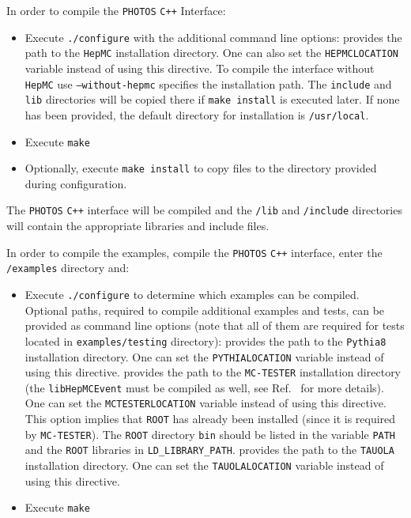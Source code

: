 \documentclass[]{Photos_interface_design}
\begin{document}
In order to compile the {\tt PHOTOS} {\tt C++} Interface:
\begin{itemize}
 \item Execute {\tt ./configure} with the additional command line options:
    provides the path to the {\tt HepMC} installation directory. One can also set the {\tt HEPMCLOCATION} variable instead of using this directive. To compile the interface without {\tt HepMC} use {\tt --without-hepmc}
    specifies the installation path. The {\tt include} and {\tt lib} directories will be copied there if {\tt make install} is executed later. If none has been provided, the default directory for installation is {\tt /usr/local}.
 \item Execute {\tt make}
 \item Optionally, execute {\tt make install} to copy files to the directory provided during configuration.
\end{itemize}

The {\tt PHOTOS} {\tt C++} interface will be compiled and the {\tt /lib} and {\tt /include} directories will contain the appropriate libraries and include files.

In order to compile the examples, compile the {\tt PHOTOS} {\tt C++} interface, enter the {\tt /examples} directory and:
\begin{itemize}
  \item Execute {\tt ./configure} to determine which examples can be compiled.
        Optional paths, required to compile additional examples and tests, can be provided as command line options
        (note that all of them are required for tests located in {\tt examples/testing} directory):
    provides the path to the {\tt Pythia8} installation
            directory. One can set the {\tt PYTHIALOCATION} variable instead of using this directive.
    provides the path to the {\tt MC-TESTER} installation
            directory (the {\tt libHepMCEvent} must be compiled as well, see Ref.~\cite{Davidson:2008ma}
			for more details). One can set the {\tt MCTESTERLOCATION} variable instead of using this
			directive. This option
			implies that {\tt ROOT} has already been installed (since it is required by {\tt MC-TESTER}).
			The {\tt ROOT} directory {\tt bin} should be listed in the variable {\tt PATH} and the {\tt ROOT}
			libraries in {\tt LD\_LIBRARY\_PATH}.
    provides the path to the {\tt TAUOLA} installation directory.
            One can set the {\tt TAUOLALOCATION} variable instead of using this directive.
  \item Execute {\tt make}
\end{itemize}
\end{document}
